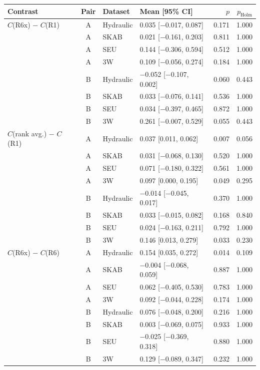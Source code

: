 \begin{tabular}{@{}l c l l rr@{}}
\toprule
Contrast & Pair & Dataset & Mean [95\% CI] & $p$ & $p_{\mathrm{Holm}}$ \\
\midrule
$C$(R6x) $-$ $C$(R1) & A & Hydraulic & 0.035 [$-$0.017, 0.087] & 0.171 & 1.000 \\
 & A & SKAB & 0.021 [$-$0.161, 0.203] & 0.811 & 1.000 \\
 & A & SEU & 0.144 [$-$0.306, 0.594] & 0.512 & 1.000 \\
 & A & 3W & 0.109 [$-$0.056, 0.274] & 0.184 & 1.000 \\
 & B & Hydraulic & $-$0.052 [$-$0.107, 0.002] & 0.060 & 0.443 \\
 & B & SKAB & 0.033 [$-$0.076, 0.141] & 0.536 & 1.000 \\
 & B & SEU & 0.034 [$-$0.397, 0.465] & 0.872 & 1.000 \\
 & B & 3W & 0.261 [$-$0.007, 0.529] & 0.055 & 0.443 \\
$C$(rank avg.) $-$ $C$(R1) & A & Hydraulic & 0.037 [0.011, 0.062] & 0.007 & 0.056 \\
 & A & SKAB & 0.031 [$-$0.068, 0.130] & 0.520 & 1.000 \\
 & A & SEU & 0.071 [$-$0.180, 0.322] & 0.561 & 1.000 \\
 & A & 3W & 0.097 [0.000, 0.195] & 0.049 & 0.295 \\
 & B & Hydraulic & $-$0.014 [$-$0.045, 0.017] & 0.370 & 1.000 \\
 & B & SKAB & 0.033 [$-$0.015, 0.082] & 0.168 & 0.840 \\
 & B & SEU & 0.024 [$-$0.163, 0.211] & 0.792 & 1.000 \\
 & B & 3W & 0.146 [0.013, 0.279] & 0.033 & 0.230 \\
$C$(R6x) $-$ $C$(R6) & A & Hydraulic & 0.154 [0.035, 0.272] & 0.014 & 0.109 \\
 & A & SKAB & $-$0.004 [$-$0.068, 0.059] & 0.887 & 1.000 \\
 & A & SEU & 0.062 [$-$0.405, 0.530] & 0.783 & 1.000 \\
 & A & 3W & 0.092 [$-$0.044, 0.228] & 0.174 & 1.000 \\
 & B & Hydraulic & 0.076 [$-$0.048, 0.200] & 0.216 & 1.000 \\
 & B & SKAB & 0.003 [$-$0.069, 0.075] & 0.933 & 1.000 \\
 & B & SEU & $-$0.025 [$-$0.369, 0.318] & 0.880 & 1.000 \\
 & B & 3W & 0.129 [$-$0.089, 0.347] & 0.232 & 1.000 \\

\end{tabular}
